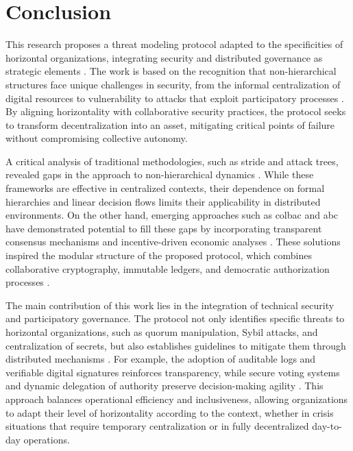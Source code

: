 
%

\chapter{Conclusion}
\label{cha:conclusion}

\glsresetall

This research proposes a threat modeling protocol adapted to the specificities
of horizontal organizations, integrating security and distributed governance as
strategic elements \cite{Colbac}. The work is based on the recognition that
non-hierarchical structures face unique challenges in security, from the
informal centralization of digital resources to vulnerability to attacks that
exploit participatory processes \cite{EverydayRevolutions,
MitigationSybilAttack}. By aligning horizontality with collaborative security
practices, the protocol seeks to transform decentralization into an asset,
mitigating critical points of failure without compromising collective autonomy.

A critical analysis of traditional methodologies, such as \gls{stride} and
attack trees, revealed gaps in the approach to non-hierarchical dynamics
\cite{ThreatModelingdesigningForSecurity, AttackTrees}. While these frameworks
are effective in centralized contexts, their dependence on formal hierarchies
and linear decision flows limits their applicability in distributed
environments. On the other hand, emerging approaches such as \gls{colbac} and
\gls{abc} have demonstrated potential to fill these gaps by incorporating
transparent consensus mechanisms and incentive-driven economic analyses
\cite{Colbac, AbcCrypto}. These solutions inspired the modular structure of the
proposed protocol, which combines collaborative cryptography, immutable ledgers,
and democratic authorization processes \cite{Colbac,
ThreatModelingdesigningForSecurity}.

The main contribution of this work lies in the integration of technical security
and participatory governance. The protocol not only identifies specific threats
to horizontal organizations, such as quorum manipulation, Sybil attacks, and
centralization of secrets, but also establishes guidelines to mitigate them
through distributed mechanisms \cite{Colbac, MitigationSybilAttack}. For
example, the adoption of auditable logs and verifiable digital signatures
reinforces transparency, while secure voting systems and dynamic delegation of
authority preserve decision-making agility \cite{Colbac}. This approach balances
operational efficiency and inclusiveness, allowing organizations to adapt their
level of horizontality according to the context, whether in crisis situations
that require temporary centralization or in fully decentralized day-to-day
operations.


